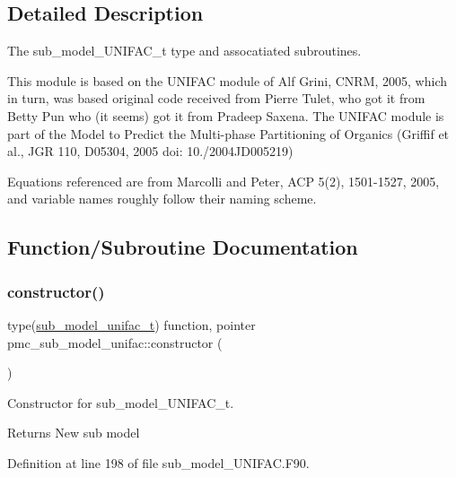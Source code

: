 \subsection{Detailed Description}
The sub\+\_\+model\+\_\+\+U\+N\+I\+F\+A\+C\+\_\+t type and assocatiated subroutines. 

This module is based on the U\+N\+I\+F\+AC module of Alf Grini, C\+N\+RM, 2005, which in turn, was based original code received from Pierre Tulet, who got it from Betty Pun who (it seems) got it from Pradeep Saxena. The U\+N\+I\+F\+AC module is part of the Model to Predict the Multi-\/phase Partitioning of Organics (Griffif et al., J\+GR 110, D05304, 2005 doi\+: 10./2004\+J\+D005219)

Equations referenced are from Marcolli and Peter, A\+CP 5(2), 1501-\/1527, 2005, and variable names roughly follow their naming scheme. 

\subsection{Function/\+Subroutine Documentation}
\mbox{\label{namespacepmc__sub__model__unifac_a7fec1fd7bbc74086fab284260f53b3aa}} 
\subsubsection{\texorpdfstring{constructor()}{constructor()}}
{\footnotesize\ttfamily type(\mbox{\hyperlink{structpmc__sub__model__unifac_1_1sub__model__unifac__t}{sub\+\_\+model\+\_\+unifac\+\_\+t}}) function, pointer pmc\+\_\+sub\+\_\+model\+\_\+unifac\+::constructor (\begin{DoxyParamCaption}{ }\end{DoxyParamCaption})\hspace{0.3cm}{\ttfamily [private]}}



Constructor for sub\+\_\+model\+\_\+\+U\+N\+I\+F\+A\+C\+\_\+t. 

\begin{DoxyReturn}{Returns}
New sub model 
\end{DoxyReturn}


Definition at line 198 of file sub\+\_\+model\+\_\+\+U\+N\+I\+F\+A\+C.\+F90.

